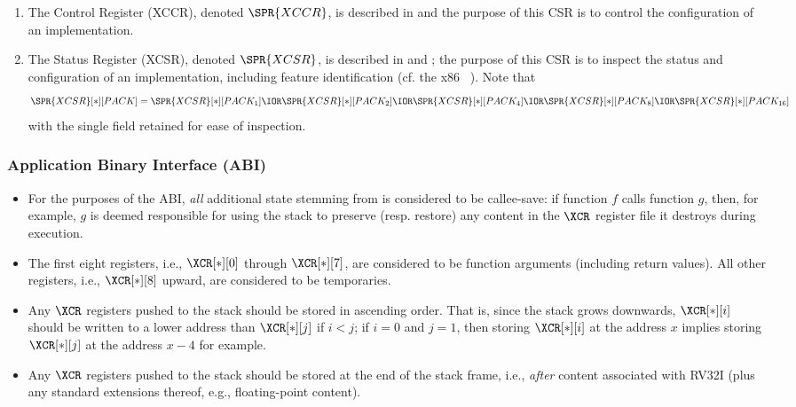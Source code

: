 \begin{enumerate}
\item The \XCID Control Register (XCCR), denoted $\SPR{XCCR}$,
      is described in  and 
      the purpose of this CSR is to 
      control the            configuration of an \XCID implementation.
\item The \XCID Status  Register (XCSR), denoted $\SPR{XCSR}$,
      is described in  and ;
      the purpose of this CSR is to 
      inspect the status and configuration of an \XCID implementation,
      including feature identification
      (cf. the x86 ~\cite[Page 3-190--3-224]{SCARV:X86:2:18}).
      Note that 
      \[
      \SPR{XCSR}[*][PACK] = \SPR{XCSR}[*][PACK_{ 1}] \IOR
                            \SPR{XCSR}[*][PACK_{ 2}] \IOR
                            \SPR{XCSR}[*][PACK_{ 4}] \IOR
                            \SPR{XCSR}[*][PACK_{ 8}] \IOR
                            \SPR{XCSR}[*][PACK_{16}]
      \]
      with the single field retained for ease of inspection.
\end{enumerate}


\subsubsection{Application Binary Interface (ABI)}
\label{sec:spec:state:abi}

\begin{itemize}
\item For the purposes of the ABI, {\em all} additional state stemming from 
      \XCID is considered to be callee-save: if function $f$ calls function
      $g$, then, for example, $g$ is deemed responsible for using the stack
      to preserve (resp. restore) any content in the $\XCR$ register file 
      it destroys during execution.
\item The first eight registers, 
      i.e., $\XCR[*][0]$ through $\XCR[*][7]$, 
      are considered to be function arguments (including return values).
      All other registers, 
      i.e., $\XCR[*][8]$ upward,
      are considered to be temporaries.
\item Any $\XCR$ registers pushed to the stack should be stored 
      in ascending order.
      That is, since the stack grows downwards, 
      $\XCR[*][i]$
      should be written to a lower address than
      $\XCR[*][j]$
      if $i < j$; if $i = 0$ and $j = 1$, then storing $\XCR[*][i]$ at the
      address $x$ implies storing $\XCR[*][j]$ at the address $x - 4$ for
      example.
\item Any $\XCR$ registers pushed to the stack should be stored 
      at the end of the stack frame, 
      i.e., {\em after} content associated with RV32I (plus any standard 
      extensions thereof, e.g., floating-point content).
\end{itemize}

